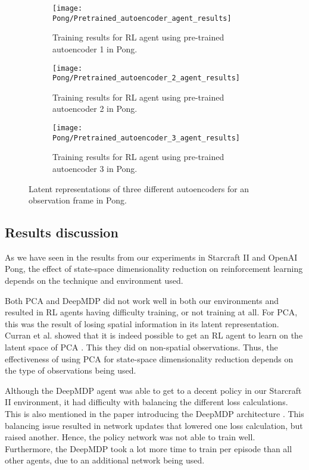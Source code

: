 \begin{figure}[h!]
	\centering
	\begin{subfigure}[b]{0.5\textwidth}
		\texttt{[image: Pong/Pretrained\_autoencoder\_agent\_results]}
		\caption{Training results for RL agent using pre-trained autoencoder 1 in Pong.}
		\label{fig:ae1-results-pong}
	\end{subfigure}
	\begin{subfigure}[b]{0.5\textwidth}
		\texttt{[image: Pong/Pretrained\_autoencoder\_2\_agent\_results]}
		\caption{Training results for RL agent using pre-trained autoencoder 2 in Pong.}
		\label{fig:ae2-results-pong}
	\end{subfigure}
	\begin{subfigure}[b]{0.5\textwidth}
		\texttt{[image: Pong/Pretrained\_autoencoder\_3\_agent\_results]}
		\caption{Training results for RL agent using pre-trained autoencoder 3 in Pong.}
		\label{fig:ae3-results-pong}
	\end{subfigure}
	\caption{Latent representations of three different autoencoders for an observation frame in Pong.}
	\label{fig:ae-results-pong}
\end{figure}

\subsection{Results discussion}\label{research-discussion}
As we have seen in the results from our experiments in Starcraft II and OpenAI Pong, the effect of state-space dimensionality reduction on reinforcement learning depends on the technique and environment used. 

Both PCA and DeepMDP did not work well in both our environments and resulted in RL agents having difficulty training, or not training at all. For PCA, this was the result of losing spatial information in its latent representation. Curran et al. showed that it is indeed possible to get an RL agent to learn on the latent space of PCA \cite{mario}. This they did on non-spatial observations. Thus, the effectiveness of using PCA for state-space dimensionality reduction depends on the type of observations being used.

Although the DeepMDP agent was able to get to a decent policy in our Starcraft II environment, it had difficulty with balancing the different loss calculations. This is also mentioned in the paper introducing the DeepMDP architecture \cite{deepmdp}. This balancing issue resulted in network updates that lowered one loss calculation, but raised another. Hence, the policy network was not able to train well. Furthermore, the DeepMDP took a lot more time to train per episode than all other agents, due to an additional network being used.

